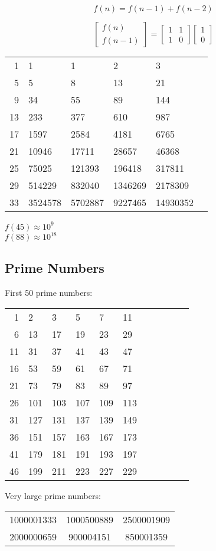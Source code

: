 \documentclass[twocolumn]{article}
\begin{document}
$$f(n)=f(n-1)+f(n-2)$$

\begin{equation*}
    \begin{bmatrix}
        f(n) \\
        f(n - 1)
    \end{bmatrix}
    =
    \begin{bmatrix}
        1 & 1 \\
        1 & 0
    \end{bmatrix}
    \begin{bmatrix}
        1 \\
        0
    \end{bmatrix}
\end{equation*}

\begin{center}
    \begin{tabular}{r|lllll}
        1 & 1 & 1 & 2 & 3 \\
        5 & 5 & 8 & 13 & 21 \\
        9 & 34 & 55 & 89 & 144 \\
        13 & 233 & 377 & 610 & 987 \\
        17 & 1597 & 2584 & 4181 & 6765 \\
        21 & 10946 & 17711 & 28657 & 46368 \\
        25 & 75025 & 121393 & 196418 & 317811 \\
        29 & 514229 & 832040 & 1346269 & 2178309 \\
        33 & 3524578 & 5702887 & 9227465 & 14930352
    \end{tabular}
\end{center}

$f(45) \approx 10^9$\\
$f(88) \approx 10^{18}$


\subsection{Prime Numbers}

First 50 prime numbers:\\
\begin{center}
    \begin{tabular}{r|llllllllll}
        1 & 2 & 3 & 5 & 7 & 11 \\
        6 & 13 & 17 & 19 & 23 & 29 \\
        11 & 31 & 37 & 41 & 43 & 47 \\
        16 & 53 & 59 & 61 & 67 & 71 \\
        21 & 73 & 79 & 83 & 89 & 97 \\
        26 & 101 & 103 & 107 & 109 & 113 \\
        31 & 127 & 131 & 137 & 139 & 149 \\
        36 & 151 & 157 & 163 & 167 & 173 \\
        41 & 179 & 181 & 191 & 193 & 197 \\
        46 & 199 & 211 & 223 & 227 & 229
    \end{tabular}
\end{center}

Very large prime numbers:\\
\begin{tabular}{ccc}
    1000001333 & 1000500889 & 2500001909 \\
    2000000659 & 900004151 & 850001359
\end{tabular}
\end{document}
